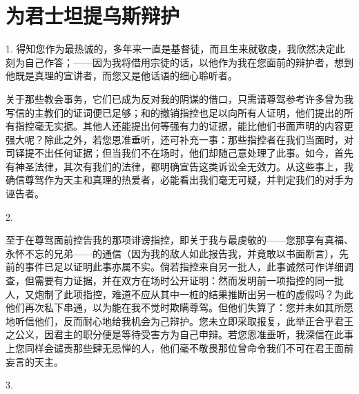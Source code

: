 
\chapter{为君士坦提乌斯辩护}


1. 得知您作为最热诚的，多年来一直是基督徒，而且生来就敬虔，我欣然决定此刻为自己作答；——因为我将借用宗徒的话，以他作为我在您面前的辩护者，想到他既是真理的宣讲者，而您又是他话语的细心聆听者。\par

关于那些教会事务，它们已成为反对我的阴谋的借口，只需请尊驾参考许多曾为我写信的主教们的证词便已足够；和的撤销指控也足以向所有人证明，他们提出的所有指控毫无实据。其他人还能提出何等强有力的证据，能比他们书面声明的内容更强大呢？除此之外，若您恩准垂听，还可补充一事：那些指控者在我们当面时，对司铎提不出任何证据；但当我们不在场时，他们却随己意处理了此事。如今，首先有神圣法律，其次有我们的法律，都明确宣告这类诉讼全无效力。从这些事上，我确信尊驾作为天主和真理的热爱者，必能看出我们毫无可疑，并判定我们的对手为诬告者。\par

2. \par

至于在尊驾面前控告我的那项诽谤指控，即关于我与最虔敬的——您那享有真福、永怀不忘的兄弟——的通信（因为我的敌人如此报告我，并竟敢以书面断言），先前的事件已足以证明此事亦属不实。倘若指控来自另一批人，此事诚然可作详细调查，但需要有力证据，并在双方在场时公开证明：然而发明前一项指控的同一批人，又炮制了此项指控，难道不应从其中一桩的结果推断出另一桩的虚假吗？为此他们再次私下串通，以为能在我不觉时欺瞒尊驾。但他们失算了：您并未如其所愿地听信他们，反而耐心地给我机会为己辩护。您未立即采取报复，此举正合乎君王之公义，因君主的职分便是等待受害方为自己申辩。若您恩准垂听，我深信在此事上您同样会谴责那些肆无忌惮的人，他们毫不敬畏那位曾命令我们不可在君王面前妄言的天主。\par

3. \par

